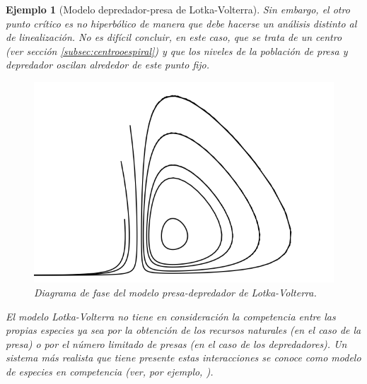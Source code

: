 \documentclass[11pt]{book}
\theoremstyle{definition}
\numberwithin{definition}{section}
\theoremstyle{theorem}
\numberwithin{theorem}{section}
\numberwithin{lemma}{section}
\numberwithin{corollary}{section}
\theoremstyle{plain}
\newtheorem{example}{Ejemplo}
\numberwithin{example}{section}
\begin{document}
\begin{example}[Modelo depredador-presa de Lotka-Volterra]
Sin embargo, el otro punto crítico es no hiperbólico de manera que debe hacerse un análisis distinto al de linealización. No es difícil concluir, en este caso, que se trata de un centro (ver sección \ref{subsec:centrooespiral}) y que los niveles de la población de presa y depredador oscilan alrededor de este punto fijo.

\begin{figure} \label{fig:lotkavolterra} \centering
	\includegraphics[scale=0.5]{figures/lotkavolterra.png}
	\caption{Diagrama de fase del modelo presa-depredador de Lotka-Volterra.}
\end{figure}

El modelo Lotka-Volterra no tiene en consideración la competencia entre las propias especies ya sea por la obtención de los recursos naturales (en el caso de la presa) o por el número limitado de presas (en el caso de los depredadores). Un sistema más realista que tiene presente estas interacciones se conoce como modelo de \emph{especies en competencia} (ver, por ejemplo, \cite[p.~171]{dynandbif}).

\end{example}
\end{document}
